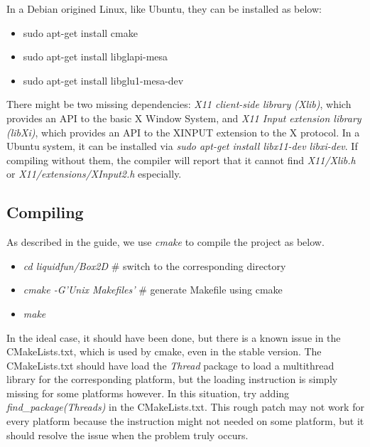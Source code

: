 \documentclass[UTF8]{ctexart}
\begin{document}
            In a Debian origined Linux, like Ubuntu, they can be installed as below:

            \begin{itemize}
                \item sudo apt-get install cmake
                \item sudo apt-get install libglapi-mesa
                \item sudo apt-get install libglu1-mesa-dev
            \end{itemize}

            There might be two missing dependencies: \textit{X11 client-side library (Xlib)}, which provides an API to the basic X Window System, and \textit{X11 Input extension library (libXi)}, which provides an API to the XINPUT extension to the X protocol. In a Ubuntu system, it can be installed via \textit{sudo apt-get install libx11-dev libxi-dev}. If compiling without them, the compiler will report that it cannot find \textit{X11/Xlib.h} or \textit{X11/extensions/XInput2.h} especially.

        \subsection{Compiling}

            As described in the guide, we use \textit{cmake} to compile the project as below.

            \begin{itemize}
                \item \textit{cd liquidfun/Box2D} \# switch to the corresponding directory
                \item \textit{cmake -G'Unix Makefiles'} \# generate Makefile using cmake
                \item \textit{make}
            \end{itemize}

            In the ideal case, it should have been done, but there is a known issue in the CMakeLists.txt, which is used by cmake, even in the stable version. The CMakeLists.txt should have load the \textit{Thread} package to load a multithread library for the corresponding platform, but the loading instruction is simply missing for some platforms however. In this situation, try adding \textit{find\_package(Threads)} in the CMakeLists.txt. This rough patch may not work for every platform because the instruction might not needed on some platform, but it should resolve the issue when the problem truly occurs.
\end{document}
